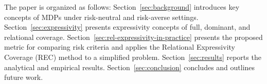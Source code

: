 \documentclass[runningheads]{llncs}
\begin{document}
The paper is organized as follows: Section~\ref{sec:background} introduces key concepts of MDPs under risk-neutral and risk-averse settings. Section~\ref{sec:expressivity} presents expressivity concepts of full, dominant, and relational coverage. Section~\ref{sec:rel-expressivity-in-practice} presents the proposed metric for comparing risk criteria and applies the Relational Expressivity Coverage (REC) method to a simplified problem. Section~\ref{sec:results} reports the analytical and empirical results. Section~\ref{sec:conclusion} concludes and outlines future work.

\end{document}
